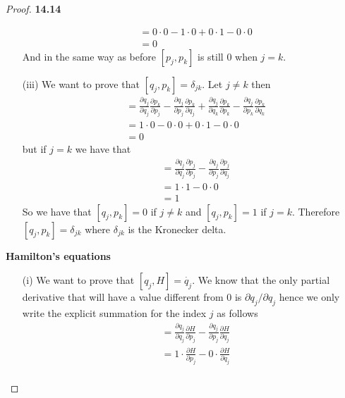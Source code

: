 \documentclass[11pt]{article}
\theoremstyle{definition}
\begin{document}
\begin{proof}{\textbf{14.14}}
\begin{itemize}
\begin{align*}
            &= 0\cdot 0 - 1\cdot 0 + 0\cdot 1 - 0\cdot 0\\
            &= 0
        \end{align*}
        And in the same way as before $[p_j,p_k]$ is still 0 when $j=k$.
        \item[(iii)] We want to prove that $[q_j, p_k] = \delta_{jk}$.
        Let $j \neq k$ then
        \begin{align*}
            [q_j, p_k] &= 
                \frac{\partial q_j}{\partial q_j}\frac{\partial p_k}{\partial p_j} -
                \frac{\partial q_j}{\partial p_j}\frac{\partial p_k}{\partial q_j}
                +
                \frac{\partial q_j}{\partial q_k}\frac{\partial p_k}{\partial p_k} -
                \frac{\partial q_j}{\partial p_k}\frac{\partial p_k}{\partial q_k}\\
            &= 1\cdot 0 - 0\cdot 0 + 0\cdot 1 - 0\cdot 0\\
            &= 0 
        \end{align*}
        but if $j = k$ we have that
        \begin{align*}
            [q_j, p_j] &= 
                \frac{\partial q_j}{\partial q_j}\frac{\partial p_j}{\partial p_j} -
                \frac{\partial q_j}{\partial p_j}\frac{\partial p_j}{\partial q_j}\\
            &= 1\cdot 1 - 0\cdot 0\\
            &= 1
        \end{align*}
        So we have that $[q_j,p_k] = 0$ if $j\neq k$ and $[q_j,p_k] = 1$ if
        $j = k$. Therefore $[q_j,p_k] = \delta_{jk}$ where $\delta_{jk}$ is
        the Kronecker delta.
    \end{itemize}
\cleardoublepage
    \textbf{Hamilton's equations}
    \begin{itemize}
        \item[(i)] We want to prove that $[q_j, H] = \dot{q_j}$.
        We know that the only partial derivative that will have a value
        different from 0 is $\partial q_j/\partial q_j$
        hence we only write the explicit summation for the index
        $j$ as follows
        \begin{align*}
            [q_j, H] &= 
                \frac{\partial q_j}{\partial q_j}\frac{\partial H}{\partial p_j} -
                \frac{\partial q_j}{\partial p_j}\frac{\partial H}{\partial q_j}\\
            &= 1\cdot \frac{\partial H}{\partial p_j} - 0\cdot \frac{\partial H}{\partial q_j}\\

\end{align*}
\end{itemize}
\end{proof}
\end{document}

